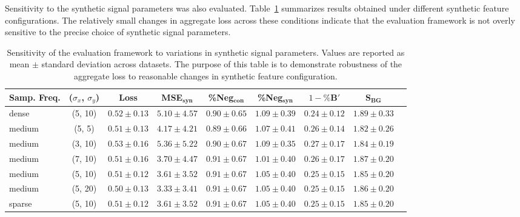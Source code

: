 Sensitivity to the synthetic signal parameters was also evaluated. Table~\ref{tab:synthetic_variations} summarizes results obtained under different synthetic feature configurations. The relatively small changes in aggregate loss across these conditions indicate that the evaluation framework is not overly sensitive to the precise choice of synthetic signal parameters.



\begin{table}[h]
\centering
\small
\begin{tabular}{lcccccccr}
\hline
Samp. Freq. & ($\sigma_x$, $\sigma_y$) & Loss & MSE$_{\mathbf{syn}}$ & \%Neg$_{\mathbf{con}}$ & \%Neg$_{\mathbf{syn}}$ & $1-\%\mathbf{B}'$ & $\mathbf{S}_{\mathbf{BG}}$ \\
\hline
dense & (5, 10) & $0.52 \pm 0.13$ & $5.10 \pm 4.57$ & $0.90 \pm 0.65$ & $1.09 \pm 0.39$ & $0.24 \pm 0.12$ & $1.89 \pm 0.33$ \\
medium & (5, 5) & $0.51 \pm 0.13$ & $4.17 \pm 4.21$ & $0.89 \pm 0.66$ & $1.07 \pm 0.41$ & $0.26 \pm 0.14$ & $1.82 \pm 0.26$ \\
medium & (3, 10) & $0.53 \pm 0.16$ & $5.36 \pm 5.22$ & $0.90 \pm 0.67$ & $1.09 \pm 0.35$ & $0.27 \pm 0.17$ & $1.84 \pm 0.19$ \\
medium & (7, 10) & $0.51 \pm 0.16$ & $3.70 \pm 4.47$ & $0.91 \pm 0.67$ & $1.01 \pm 0.40$ & $0.26 \pm 0.17$ & $1.87 \pm 0.20$ \\
medium & (5, 10) & $0.51 \pm 0.12$ & $3.61 \pm 3.52$ & $0.91 \pm 0.67$ & $1.05 \pm 0.40$ & $0.25 \pm 0.15$ & $1.85 \pm 0.20$ \\
medium & (5, 20) & $0.50 \pm 0.13$ & $3.33 \pm 3.41$ & $0.91 \pm 0.67$ & $1.05 \pm 0.40$ & $0.25 \pm 0.15$ & $1.86 \pm 0.20$ \\
sparse & (5, 10) & $0.51 \pm 0.12$ & $3.61 \pm 3.52$ & $0.91 \pm 0.67$ & $1.05 \pm 0.40$ & $0.25 \pm 0.15$ & $1.85 \pm 0.20$ \\
\hline
\end{tabular}
\caption{Sensitivity of the evaluation framework to variations in synthetic signal parameters. Values are reported as mean $\pm$ standard deviation across datasets. The purpose of this table is to demonstrate robustness of the aggregate loss to reasonable changes in synthetic feature configuration.}
\label{tab:synthetic_variations}
\end{table}






